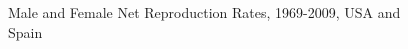 \begin{figure}[ht!]
        \centering  
          \caption{Male and Female Net Reproduction Rates, 1969-2009, USA and
          Spain}
          \label{fig:NRRseries}
\end{figure}





 









